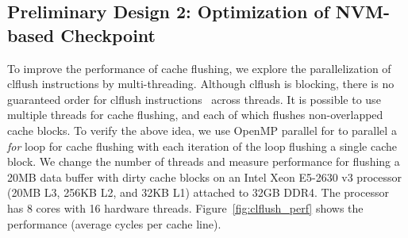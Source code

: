 \subsection{Preliminary Design 2: Optimization of NVM-based Checkpoint}
To improve the performance of cache flushing, we explore 
the parallelization of {\selectfont clflush} instructions by multi-threading.  
Although {\selectfont clflush} is blocking, 
there is no guaranteed order for {\selectfont clflush} instructions~\cite{clflush} across threads.
It is possible to use multiple threads for cache flushing, and
each of which flushes non-overlapped cache blocks.
To verify the above idea, we use OpenMP {\selectfont parallel for} to parallel a \textit{for} loop for cache flushing with each iteration of the loop flushing a single cache block.
We change the number of threads and measure performance for flushing a 20MB data buffer with dirty cache blocks on an Intel Xeon E5-2630 v3 processor (20MB L3, 256KB L2, and 32KB L1)
attached to 32GB DDR4. The processor has 8 cores with 16 hardware threads.
Figure~\ref{fig:clflush_perf} shows the performance (average cycles per cache line).

